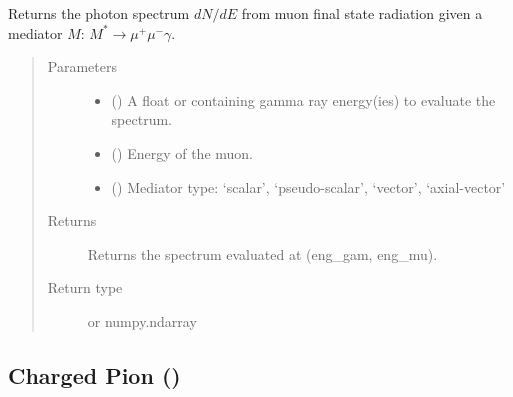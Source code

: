 \documentclass[letterpaper,10pt,english]{sphinxmanual}
\begin{document}

\begin{fulllineitems}
\label{\detokenize{Modules:muon.fsr}}
Returns the photon spectrum \(dN/dE\) from muon final state radiation given a mediator \(M\): \(M^{*}\to\mu^{+}\mu^{-}\gamma\).
\begin{quote}\begin{description}
\item[{Parameters}] \leavevmode\begin{itemize}
\item {} 
 () \textendash{} A float or  containing gamma ray energy(ies) to evaluate the spectrum.

\item {} 
 () \textendash{} Energy of the muon.

\item {} 
 () \textendash{} Mediator type: ‘scalar’, ‘pseudo-scalar’, ‘vector’, ‘axial-vector’

\end{itemize}

\item[{Returns}] \leavevmode
Returns the spectrum evaluated at (eng\_gam, eng\_mu).

\item[{Return type}] \leavevmode
{} or numpy.ndarray

\end{description}\end{quote}

\end{fulllineitems}



\subsection{Charged Pion ()}
\label{\detokenize{Modules:charged-pion-hazma-particles-charged-pion}}
\end{document}
